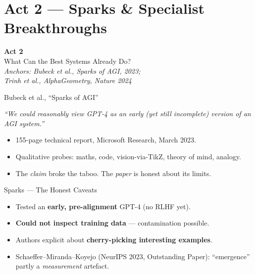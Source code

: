 \documentclass[aspectratio=169, 12pt, xcolor={dvipsnames,table}]{beamer}
\newcommand{\bigquote}[1]{%
  \begin{center}
    \large\itshape ``#1''
  \end{center}
}
\newcommand{\sourcemark}[1]{\hfill{\tiny\color{gray}#1}}
\begin{document}
\section{Act 2 --- Sparks \& Specialist Breakthroughs}

\begin{frame}[plain]
\begin{center}
  {\Huge\bfseries Act 2}\\[0.4em]
  {\large What Can the Best Systems Already Do?}\\[1.5em]
  {\footnotesize\itshape Anchors: Bubeck et al., \emph{Sparks of AGI}, 2023;\\
   Trinh et al., AlphaGeometry, \emph{Nature} 2024}
\end{center}
\end{frame}

\begin{frame}{Bubeck et al., ``Sparks of AGI''}
\bigquote{We could reasonably view GPT-4 as an early (yet still
incomplete) version of an AGI system.}
\vspace{0.6em}
\begin{itemize}
  \item 155-page technical report, Microsoft Research, March 2023.
  \item Qualitative probes: maths, code, vision-via-TikZ, theory of mind, analogy.
  \item The \emph{claim} broke the taboo. The \emph{paper} is honest about its limits.
\end{itemize}
\sourcemark{\citealp{bubeck2023sparks}}
\end{frame}

\begin{frame}{Sparks --- The Honest Caveats}
\begin{itemize}
  \item Tested an \textbf{early, pre-alignment} GPT-4 (no RLHF yet).
  \item \textbf{Could not inspect training data} --- contamination possible.
  \item Authors explicit about \textbf{cherry-picking interesting examples}.
  \item Schaeffer--Miranda--Koyejo (NeurIPS 2023, Outstanding Paper):
        ``emergence'' partly a \emph{measurement} artefact.
\end{itemize}
\sourcemark{\citealp{schaeffer2023mirage}}
\end{frame}
\end{document}
